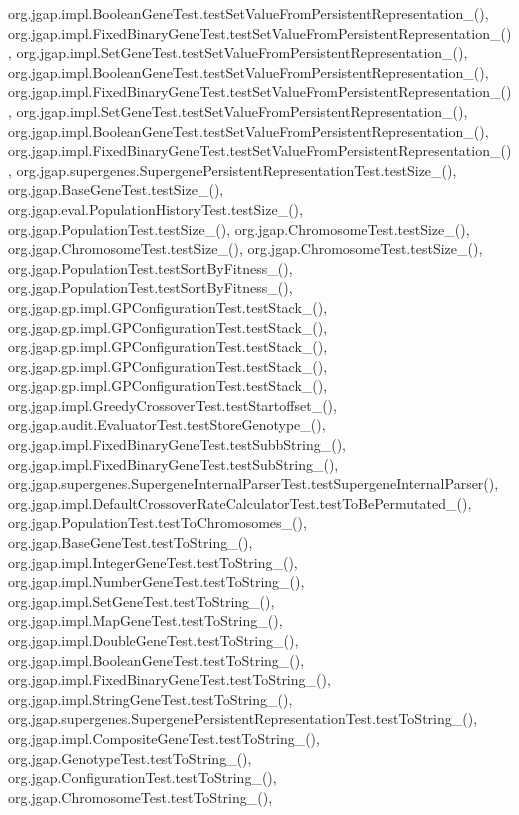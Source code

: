 org.\-jgap.\-impl.\-Boolean\-Gene\-Test.\-test\-Set\-Value\-From\-Persistent\-Representation\-\_(), org.\-jgap.\-impl.\-Fixed\-Binary\-Gene\-Test.\-test\-Set\-Value\-From\-Persistent\-Representation\-\_(), org.\-jgap.\-impl.\-Set\-Gene\-Test.\-test\-Set\-Value\-From\-Persistent\-Representation\-\_(), org.\-jgap.\-impl.\-Boolean\-Gene\-Test.\-test\-Set\-Value\-From\-Persistent\-Representation\-\_(), org.\-jgap.\-impl.\-Fixed\-Binary\-Gene\-Test.\-test\-Set\-Value\-From\-Persistent\-Representation\-\_(), org.\-jgap.\-impl.\-Set\-Gene\-Test.\-test\-Set\-Value\-From\-Persistent\-Representation\-\_(), org.\-jgap.\-impl.\-Boolean\-Gene\-Test.\-test\-Set\-Value\-From\-Persistent\-Representation\-\_(), org.\-jgap.\-impl.\-Fixed\-Binary\-Gene\-Test.\-test\-Set\-Value\-From\-Persistent\-Representation\-\_(), org.\-jgap.\-supergenes.\-Supergene\-Persistent\-Representation\-Test.\-test\-Size\-\_(), org.\-jgap.\-Base\-Gene\-Test.\-test\-Size\-\_(), org.\-jgap.\-eval.\-Population\-History\-Test.\-test\-Size\-\_(), org.\-jgap.\-Population\-Test.\-test\-Size\-\_(), org.\-jgap.\-Chromosome\-Test.\-test\-Size\-\_(), org.\-jgap.\-Chromosome\-Test.\-test\-Size\-\_(), org.\-jgap.\-Chromosome\-Test.\-test\-Size\-\_(), org.\-jgap.\-Population\-Test.\-test\-Sort\-By\-Fitness\-\_(), org.\-jgap.\-Population\-Test.\-test\-Sort\-By\-Fitness\-\_(), org.\-jgap.\-gp.\-impl.\-G\-P\-Configuration\-Test.\-test\-Stack\-\_(), org.\-jgap.\-gp.\-impl.\-G\-P\-Configuration\-Test.\-test\-Stack\-\_(), org.\-jgap.\-gp.\-impl.\-G\-P\-Configuration\-Test.\-test\-Stack\-\_(), org.\-jgap.\-gp.\-impl.\-G\-P\-Configuration\-Test.\-test\-Stack\-\_(), org.\-jgap.\-gp.\-impl.\-G\-P\-Configuration\-Test.\-test\-Stack\-\_(), org.\-jgap.\-impl.\-Greedy\-Crossover\-Test.\-test\-Startoffset\-\_(), org.\-jgap.\-audit.\-Evaluator\-Test.\-test\-Store\-Genotype\-\_(), org.\-jgap.\-impl.\-Fixed\-Binary\-Gene\-Test.\-test\-Subb\-String\-\_(), org.\-jgap.\-impl.\-Fixed\-Binary\-Gene\-Test.\-test\-Sub\-String\-\_(), org.\-jgap.\-supergenes.\-Supergene\-Internal\-Parser\-Test.\-test\-Supergene\-Internal\-Parser(), org.\-jgap.\-impl.\-Default\-Crossover\-Rate\-Calculator\-Test.\-test\-To\-Be\-Permutated\-\_(), org.\-jgap.\-Population\-Test.\-test\-To\-Chromosomes\-\_(), org.\-jgap.\-Base\-Gene\-Test.\-test\-To\-String\-\_(), org.\-jgap.\-impl.\-Integer\-Gene\-Test.\-test\-To\-String\-\_(), org.\-jgap.\-impl.\-Number\-Gene\-Test.\-test\-To\-String\-\_(), org.\-jgap.\-impl.\-Set\-Gene\-Test.\-test\-To\-String\-\_(), org.\-jgap.\-impl.\-Map\-Gene\-Test.\-test\-To\-String\-\_(), org.\-jgap.\-impl.\-Double\-Gene\-Test.\-test\-To\-String\-\_(), org.\-jgap.\-impl.\-Boolean\-Gene\-Test.\-test\-To\-String\-\_(), org.\-jgap.\-impl.\-Fixed\-Binary\-Gene\-Test.\-test\-To\-String\-\_(), org.\-jgap.\-impl.\-String\-Gene\-Test.\-test\-To\-String\-\_(), org.\-jgap.\-supergenes.\-Supergene\-Persistent\-Representation\-Test.\-test\-To\-String\-\_(), org.\-jgap.\-impl.\-Composite\-Gene\-Test.\-test\-To\-String\-\_(), org.\-jgap.\-Genotype\-Test.\-test\-To\-String\-\_(), org.\-jgap.\-Configuration\-Test.\-test\-To\-String\-\_(), org.\-jgap.\-Chromosome\-Test.\-test\-To\-String\-\_(), 